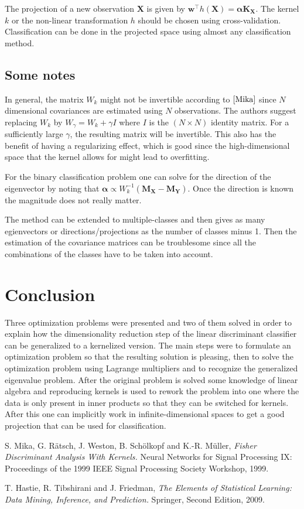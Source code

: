 \documentclass[a4paper, 12pt]{scrartcl}
\newcommand{\bfw}{\mathbf{w}}
\newcommand{\bfX}{\mathbf{X}}
\newcommand{\bfY}{\mathbf{Y}}
\newcommand{\bfalpha}{\boldsymbol{\alpha}}
\begin{document}
The projection of a new observation $\bfX$ is given by $\bfw^\intercal h\left(\bfX\right)=\bfalpha \mathbf{K}_\bfX$. The kernel $k$ or the non-linear transformation $h$ should be chosen using cross-validation. Classification can be done in the projected space using almost any classification method.

\subsection{Some notes}
In general, the matrix $W_k$ might not be invertible according to $\cite{Mika}$ since $N$ dimensional covariances are estimated using $N$ observations. The authors suggest replacing $W_k$ by $W_\gamma=W_k+\gamma I$ where $I$ is the $\left(N\times N\right)$ identity matrix. For a sufficiently large $\gamma$, the resulting matrix will be invertible. This also has the benefit of having a regularizing effect, which is good since the high-dimensional space that the kernel allows for might lead to overfitting.

For the binary classification problem one can solve for the direction of the eigenvector by noting that $\bfalpha\propto W_k^{-1}\left(\mathbf{M}_\bfX-\mathbf{M}_\bfY\right)$. Once the direction is known the magnitude does not really matter.

The method can be extended to multiple-classes and then gives as many egienvectors or directions/projections as the number of classes minus 1. Then the estimation of the covariance matrices can be troublesome since all the combinations of the classes have to be taken into account.

\section{Conclusion}
Three optimization problems were presented and two of them solved in order to explain how the dimensionality reduction step of the linear discriminant classifier can be generalized to a kernelized version. The main steps were to formulate an optimization problem so that the resulting solution is pleasing, then to solve the optimization problem using Lagrange multipliers and to recognize the generalized eigenvalue problem. After the original problem is solved some knowledge of linear algebra and reproducing kernels is used to rework the problem into one where the data is only present in inner products so that they can be switched for kernels. After this one can implicitly work in infinite-dimensional spaces to get a good projection that can be used for classification.

\begin{thebibliography}{2}
	 S. Mika, G. Rätsch, J. Weston, B. Schölkopf and K.-R. Müller, \emph{Fisher Discriminant Analysis With Kernels.} Neural Networks for Signal Processing IX: Proceedings of the 1999 IEEE Signal Processing Society Workshop, 1999.
	
	 T. Hastie, R. Tibshirani and  J. Friedman, \emph{The Elements of Statistical Learning: Data Mining, Inference, and Prediction.} Springer, Second Edition, 2009.
\end{thebibliography}
\end{document}

